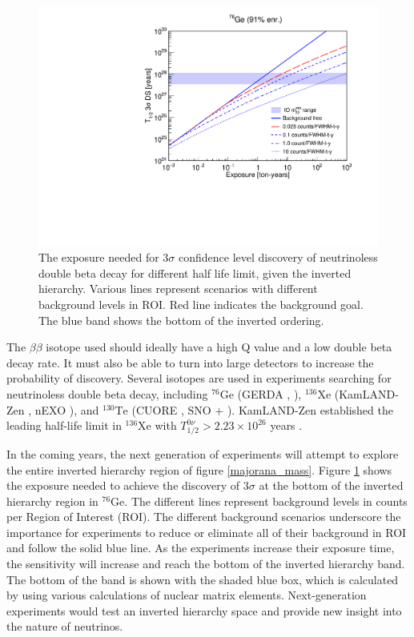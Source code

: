 \begin{figure}[!htb]
\centering
\includegraphics[width=0.99\linewidth]{ch1/figs/ThreeSigDL.pdf}
\caption{The exposure needed for 3$\sigma$ confidence level discovery of neutrinoless double beta decay for different half life limit, given the inverted hierarchy. Various lines represent scenarios with different background levels in ROI. Red line indicates the {\Lthou} background goal. The blue band shows the bottom of the inverted ordering.}
\label{exposure_plot}
\end{figure}

The $\beta\beta$ isotope used should ideally have a high Q value and a low double beta decay rate. It must also be able to turn into large detectors to increase the probability of discovery. Several isotopes are used in experiments searching for neutrinoless double beta decay, including ${}^{76}\mathrm{Ge}$ (GERDA \cite{GERDA_final}, {\MJD} \cite{Majorana_final}), ${}^{136}\mathrm{Xe}$ (KamLAND-Zen \cite{KamLAND-Zen:2024eml}, nEXO \cite{nEXO:2021ujk}), and ${}^{130}\mathrm{Te}$ (CUORE \cite{Arnaboldi2002du}, SNO $+$ \cite{SNO_paper}). KamLAND-Zen established the leading half-life limit in $^{136}$Xe with $T^{0\nu}_{1/2} > 2.23 \times 10^{26}$ years \cite{KamLAND-Zen:2024eml}. 


In the coming years, the next generation of experiments will attempt to explore the entire inverted hierarchy region of figure \ref{majorana_mass}. Figure \ref{exposure_plot} shows the exposure needed to achieve the discovery of $3\sigma$ at the bottom of the inverted hierarchy region in ${}^{76}\mathrm{Ge}$. The different lines represent background levels in counts per Region of Interest (ROI). The different background scenarios underscore the importance for experiments to reduce or eliminate all of their background in ROI and follow the solid blue line. As the experiments increase their exposure time, the sensitivity will increase and reach the bottom of the inverted hierarchy band. The bottom of the band is shown with the shaded blue box, which is calculated by using various calculations of nuclear matrix elements. Next-generation experiments would test an inverted hierarchy space and provide new insight into the nature of neutrinos.

